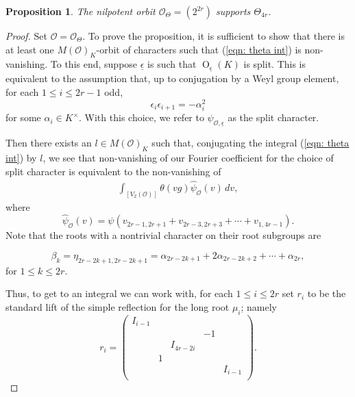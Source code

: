 \documentclass[11pt,reqno]{amsart}
\newtheorem{Prop}[Thm]{Proposition}
\theoremstyle{definition}
\theoremstyle{remark}
\theoremstyle{definition}
\begin{document}
\begin{Prop}\label{Prop: nonvan even}
The nilpotent orbit ${\mathcal{O}}_{\Theta}=(2^{2r})$ supports $\Theta_{4r}$.
\end{Prop}
\begin{proof}
Set ${\mathcal{O}}={\mathcal{O}}_\Theta$. To prove the proposition, it is sufficient to show that there is at least one $M({\mathcal{O}})_K$-orbit of characters such that (\ref{eqn: theta int}) is non-vanishing. To this end, suppose $\underline{\epsilon}$ is such that $\operatorname{O}_{\underline{\epsilon}}(K)$ is split. This is equivalent to the assumption that, up to conjugation by a Weyl group element, for each $1\leq i \leq 2r-1$ odd, $${\epsilon}_i{\epsilon}_{i+1} =-{\alpha}_i^2$$ for some ${\alpha}_i\in K^\times$. With this choice, we refer to $\psi_{{\mathcal{O}},\underline{\epsilon}}$ as the split character.

Then there exists an $l\in M({\mathcal{O}})_K$ such that, conjugating the integral (\ref{eqn: theta int}) by $l$, we see that non-vanishing of our Fourier coefficient for the choice of split character is equivalent to the non-vanishing of
\begin{align}
\displaystyle \int_{[V_2({\mathcal{O}})]} \theta(vg) \hat{\psi}_{\mathcal{O}}(v)\,dv,
\end{align}
where 
\[
\hat{\psi}_{\mathcal{O}}(v) = \psi( v_{2r-1,2r+1} + v_{2r-3,2r+3}+\cdots + v_{1,4r-1}).
\]
Note that the roots with a nontrivial character on their root subgroups are

 $${\beta}_k = \eta_{2r-2k+1,2r-2k+1}={\alpha}_{2r-2k+1}+2{\alpha}_{2r-2k+2}+\cdots +{\alpha}_{2r},$$ 
for $1\leq k \leq 2r$.

Thus, to get to an integral we can work with, for each $1\leq i \leq2r$ set $r_i$ to be the standard lift of the simple reflection for the long root $\mu_i$; namely
\[
r_i = \left( \begin{array}{ccccc}
									I_{i-1}&&&&\\
									&&&-1&\\
									&&I_{4r-2i}&&\\
									&1&&&\\
									&&&&I_{i-1}\\\end{array}\right).
\]


\end{proof}
\end{document}
